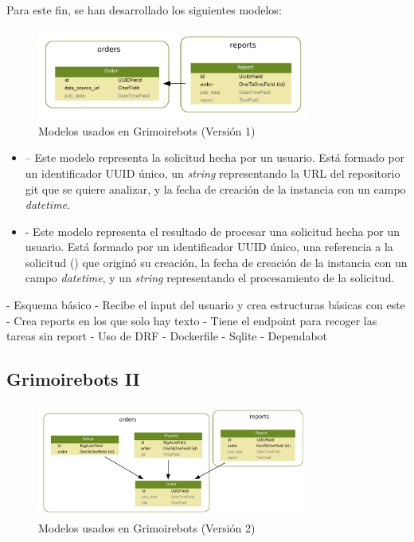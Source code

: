 Para este fin, se han desarrollado los siguientes modelos:

\begin{figure}[ht]
    \centering
    \includegraphics[width=0.8\textwidth]{Figures/grimoirebots_i_models}
    \decoRule
    \caption[Grimoirebots I (modelos)]{Modelos usados en Grimoirebots (Versión 1)}
    \label{fig:grimoirebots_i_models}
\end{figure}

\begin{itemize}
    \item {} -- Este modelo representa la solicitud hecha por un usuario. Está formado por un identificador UUID único, un \emph{string} representando la URL del repositorio git que se quiere analizar, y la fecha de creación de la instancia con un campo \emph{datetime}.
    \item {} - Este modelo representa el resultado de procesar una solicitud hecha por un usuario. Está formado por un identificador UUID único, una referencia a la solicitud () que originó su creación, la fecha de creación de la instancia con un campo \emph{datetime}, y un \emph{string} representando el procesamiento de la solicitud.
\end{itemize}

- Esquema básico
- Recibe el input del usuario y crea estructuras básicas con este
- Crea reports en los que solo hay texto
- Tiene el endpoint para recoger las tareas sin report
- Uso de DRF
- Dockerfile
- Sqlite
- Dependabot

\subsection{Grimoirebots II}

\begin{figure}[ht]
    \centering
    \includegraphics[width=0.8\textwidth]{Figures/grimoirebots_ii_models}
    \decoRule
    \caption[Grimoirebots II (modelos)]{Modelos usados en Grimoirebots (Versión 2)}
    \label{fig:grimoirebots_ii_models}
\end{figure}

